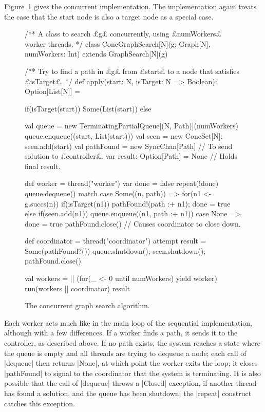 Figure~\ref{fig:graph-search-conc} gives the concurrent implementation.  The
implementation again treats the case that the start node is also a target node
as a special case. 



\begin{figure}
\begin{scala}
/** A class to search £g£ concurrently, using £numWorkers£ worker threads. */
class ConcGraphSearch[N](g: Graph[N], numWorkers: Int) 
    extends GraphSearch[N](g){
  /** Try to find a path in £g£ from £start£ to a node that satisfies £isTarget£. */
  def apply(start: N, isTarget: N => Boolean): Option[List[N]] = {
    if(isTarget(start)) Some(List(start))
    else{
      val queue = new TerminatingPartialQueue[(N, Path)](numWorkers)
      queue.enqueue((start, List(start)))
      val seen = new ConcSet[N]; seen.add(start)
      val pathFound = new SyncChan[Path] // To send solution to £controller£.
      var result: Option[Path] = None // Holds final result. 

      def worker = thread("worker"){
        var done = false
        repeat(!done){
          queue.dequeue() match{
            case Some((n, path)) =>
              for(n1 <- g.succs(n)){
                if(isTarget(n1)){ pathFound!(path :+ n1); done = true } 
                else if(seen.add(n1)) queue.enqueue((n1, path :+ n1))
              }
            case None => done = true
          }
        }
        pathFound.close() // Causes coordinator to close down.
      }

      def coordinator = thread("coordinator"){
        attempt{ result = Some(pathFound?()) }{ }
        queue.shutdown(); seen.shutdown(); pathFound.close()
      }

      val workers = || (for(_ <- 0 until numWorkers) yield worker)
      run(workers || coordinator)
      result
    }
  }
}
\end{scala}
\caption{The concurrent graph search algorithm.}
\label{fig:graph-search-conc}
\end{figure}


Each worker acts much like in the main loop of the sequential implementation,
although with a few differences.  If a worker finds a path, it sends it to the
controller, as described above.  If no path exists, the system reaches a state
where the queue is empty and all threads are trying to dequeue a node; each
call of |dequeue| then returns |None|, at which point the worker exits the
loop; it closes |pathFound| to signal to the coordinator that the system is
terminating.  It is also possible that the call of |dequeue| throws a |Closed|
exception, if another thread has found a solution, and the queue has been
shutdown; the |repeat| construct catches this exception.

